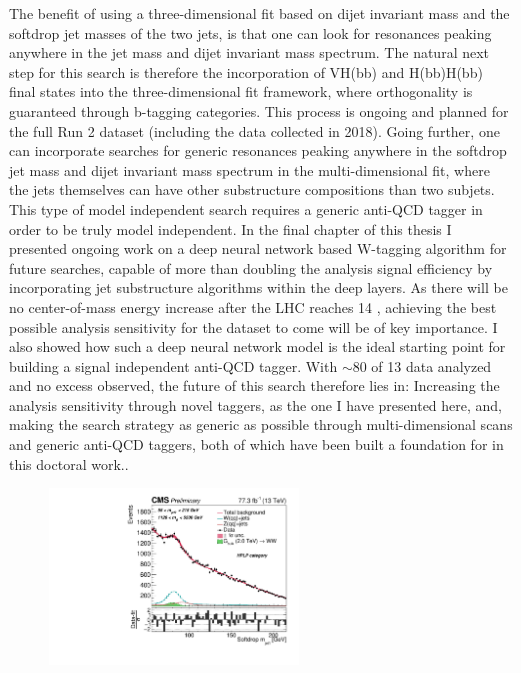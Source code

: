 \newline
The benefit of using a three-dimensional fit based on dijet invariant mass and the softdrop jet masses of the two jets, is that one can look for resonances peaking anywhere in the jet mass and dijet invariant mass spectrum. The natural next step for this search is therefore the incorporation of VH(bb) and H(bb)H(bb) final states into the three-dimensional fit framework, where orthogonality is guaranteed through b-tagging categories. This process is ongoing and planned for the full Run 2 dataset (including the data collected in 2018).\newline
Going further, one can incorporate searches for generic resonances peaking anywhere in the softdrop jet mass and dijet invariant mass spectrum in the multi-dimensional fit, where the jets themselves can have other substructure compositions than two subjets. This type of model independent search requires a generic anti-QCD tagger in order to be truly model independent. In the final chapter of this thesis I presented ongoing work on a deep neural network based W-tagging algorithm for future searches, capable of more than doubling the analysis signal efficiency by incorporating jet substructure algorithms within the deep layers. As there will be no center-of-mass energy increase after the LHC reaches 14 \TeV, achieving the best possible analysis sensitivity for the dataset to come will be of key importance. I also showed how such a deep neural network model is the ideal starting point for building a signal independent anti-QCD tagger.
\newline
\newline
With $\sim80$ \fbinv of 13 \TeV data analyzed and no excess observed, the future of this search therefore lies in: Increasing the analysis sensitivity through novel taggers, as the one I have presented here, and, making the search strategy as generic as possible through multi-dimensional scans and generic anti-QCD taggers, both of which have been built a foundation for in this doctoral work..

\begin{figure}[b!]
\centering
\includegraphics[width=0.59\textwidth]{figures/analysis/search3/AN-17-303/postfitchecks/postfit_HPLP_unblind/PostFitComboHPLP_X-Proj__y___0_-1_z___0_-1.pdf}
\label{fig:summary}
\end{figure}